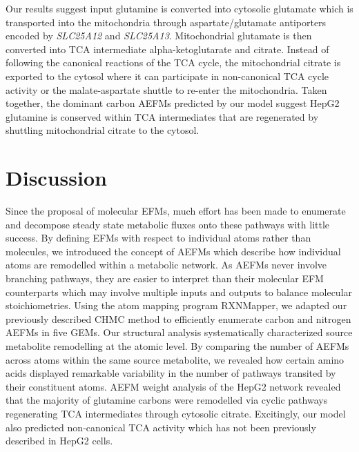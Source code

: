 \documentclass[12pt]{article}
\begin{document}
Our results suggest input glutamine is converted into cytosolic glutamate which
is transported into the mitochondria through aspartate/glutamate antiporters
encoded by \textit{SLC25A12} and \textit{SLC25A13}. Mitochondrial glutamate is
then converted into TCA intermediate alpha-ketoglutarate and citrate. Instead
of following the canonical reactions of the TCA cycle, the mitochondrial
citrate is exported to the cytosol where it can participate in non-canonical
TCA cycle activity or the malate-aspartate shuttle to re-enter the
mitochondria. Taken together, the dominant carbon AEFMs predicted by our model
suggest HepG2 glutamine is conserved within TCA intermediates that are
regenerated by shuttling mitochondrial citrate to the cytosol.

\section*{Discussion}

Since the proposal of molecular EFMs, much effort has been made to
enumerate and decompose steady state metabolic fluxes onto these pathways
with little success. By defining EFMs with respect to individual atoms
rather than molecules, we introduced the concept of AEFMs which describe
how individual atoms are remodelled within a metabolic network. As AEFMs
never involve branching pathways, they are easier to interpret than their
molecular EFM counterparts which may involve multiple inputs and outputs
to balance molecular stoichiometries. Using the atom mapping program
RXNMapper, we adapted our previously described CHMC method to efficiently
enumerate carbon and nitrogen AEFMs in five GEMs. Our structural analysis
systematically characterized source metabolite remodelling at the atomic
level. By comparing the number of AEFMs across atoms within the same
source metabolite, we revealed how certain amino acids displayed
remarkable variability in the number of pathways transited by their
constituent atoms. AEFM weight analysis of the HepG2 network revealed that
the majority of glutamine carbons were remodelled via cyclic pathways
regenerating TCA intermediates through cytosolic citrate. Excitingly, our
model also predicted non-canonical TCA activity which has not been
previously described in HepG2 cells.
\end{document}
